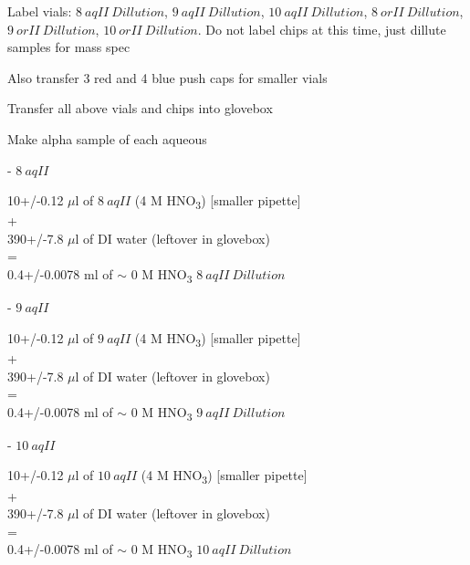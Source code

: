 \documentclass[idxtotoc,hyperref,openany,oneside]{labbook} %
\newcommand{\tsbs}{\textsubscript}
\begin{document}
\begin{todolist}
\item{Label vials:
  $\boxed{8\ aqII\ Dillution}$,
  $\boxed{9\ aqII\ Dillution}$,
  $\boxed{10\ aqII\ Dillution}$,
  $\boxed{8\ orII\ Dillution}$,
  $\boxed{9\ orII\ Dillution}$,
  $\boxed{10\ orII\ Dillution}$.
  Do not label chips at this time, just dillute samples
  for mass spec}
\item{Also transfer 3 red and 4 blue push caps for smaller vials}
\item{Transfer all above vials and chips into glovebox}

  
\item{Make alpha sample of each aqueous}
\begin{todolist}
\item{- $\boxed{8\ aqII}$}
\end{todolist}
\begin{center}
10+/-0.12 $\mu$l of $\boxed{8\ aqII}$ (4 M HNO\tsbs{3}) [smaller pipette]\\
+\\
390+/-7.8 $\mu$l of DI water (leftover in glovebox)\\
=\\
0.4+/-0.0078 ml of $\sim$ 0 M HNO\tsbs{3} $\boxed{8\ aqII\ Dillution}$
\end{center}

\begin{todolist}
\item{- $\boxed{9\ aqII}$}
\end{todolist}
\begin{center}
10+/-0.12 $\mu$l of $\boxed{9\ aqII}$ (4 M HNO\tsbs{3}) [smaller pipette]\\
+\\
390+/-7.8 $\mu$l of DI water (leftover in glovebox)\\
=\\
0.4+/-0.0078 ml of $\sim$ 0 M HNO\tsbs{3} $\boxed{9\ aqII\ Dillution}$
\end{center}

\begin{todolist}
\item{- $\boxed{10\ aqII}$}
\end{todolist}
\begin{center}
10+/-0.12 $\mu$l of $\boxed{10\ aqII}$ (4 M HNO\tsbs{3}) [smaller pipette]\\
+\\
390+/-7.8 $\mu$l of DI water (leftover in glovebox)\\
=\\
0.4+/-0.0078 ml of $\sim$ 0 M HNO\tsbs{3} $\boxed{10\ aqII\ Dillution}$
\end{center}


\end{todolist}
\end{document}
